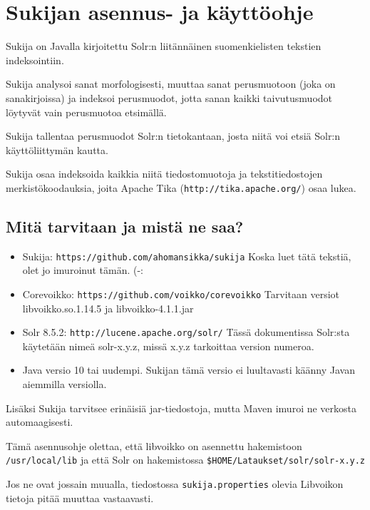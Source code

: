\documentclass[12pt]{article}
\begin{document}
\pagestyle{fancy}
\setlength{\parindent}{0pt}
\setlength{\parskip}{1ex plus 0.5ex minus 0.2ex}
\section*{Sukijan asennus- ja käyttöohje}


Sukija on Javalla kirjoitettu Solr:n liitännäinen suomenkielisten
tekstien indeksointiin.

Sukija analysoi sanat morfologisesti, muuttaa sanat perusmuotoon (joka
on sanakirjoissa) ja indeksoi perusmuodot, jotta sanan kaikki
taivutusmuodot löytyvät vain perusmuotoa etsimällä.

Sukija tallentaa perusmuodot Solr:n tietokantaan, josta niitä voi
etsiä Solr:n käyttöliittymän kautta.

Sukija osaa indeksoida kaikkia niitä tiedostomuotoja ja
tekstitiedostojen merkistökoodauksia, joita Apache Tika
(\verb=http://tika.apache.org/=) osaa lukea.


\subsection*{Mitä tarvitaan ja mistä ne saa?}

\begin{itemize}
\item Sukija:
      \verb=https://github.com/ahomansikka/sukija=
      Koska luet tätä tekstiä, olet jo imuroinut tämän. (-:

\item Corevoikko:
      \verb=https://github.com/voikko/corevoikko=
      Tarvitaan versiot libvoikko.so.1.14.5 ja libvoikko-4.1.1.jar

\item Solr 8.5.2:
      \verb=http://lucene.apache.org/solr/=
      Tässä dokumentissa Solr:sta käytetään nimeä solr-x.y.z,
      missä x.y.z tarkoittaa version numeroa.

\item Java versio 10 tai uudempi. Sukijan tämä versio ei luultavasti
      käänny Javan aiemmilla versiolla.
\end{itemize}


Lisäksi Sukija tarvitsee erinäisiä jar-tiedostoja, mutta Maven imuroi
ne verkosta automaagisesti.

Tämä asennusohje olettaa, että libvoikko on asennettu hakemistoon
\verb=/usr/local/lib= ja että Solr on hakemistossa
\verb=$HOME/Lataukset/solr/solr-x.y.z=

Jos ne ovat jossain muualla, tiedostossa \verb=sukija.properties=
olevia Libvoikon tietoja pitää muuttaa vastaavasti.
\end{document}
